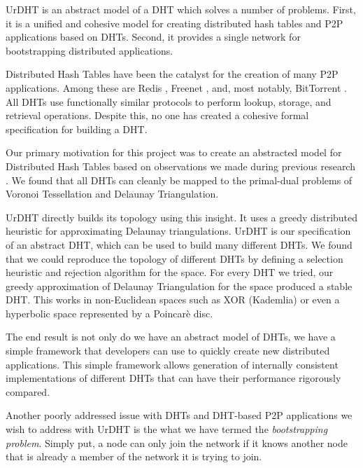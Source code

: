 \documentclass[11pt,conference]{IEEEtran}
\begin{document}
UrDHT is an abstract model of a DHT which solves a number of problems.
First, it is a unified and cohesive model for creating distributed hash tables and P2P applications based on DHTs.
Second, it provides a single network for bootstrapping distributed applications.
%

Distributed Hash Tables have been the catalyst for the creation of many P2P applications.
Among these are Redis \cite{redis}, Freenet \cite{freenet}, and, most notably, BitTorrent \cite{bittorrent}. 
All DHTs use functionally similar protocols to perform lookup, storage, and retrieval operations.
Despite this, no one has created a cohesive formal specification for building a DHT.

Our primary motivation for this project was to create an abstracted model for Distributed Hash Tables based on observations we made during previous research \cite{dgvh}.
We found that all DHTs can cleanly be mapped to the primal-dual problems of Voronoi Tessellation and Delaunay Triangulation.

UrDHT directly builds its topology using this insight.
It uses a greedy distributed heuristic for approximating Delaunay triangulations.
UrDHT is our specification of an abstract DHT, which can be used to build many different DHTs.
We found that we could reproduce the topology of different DHTs by defining a selection heuristic and rejection algorithm for the space.
For every DHT we tried, our greedy approximation of Delaunay Triangulation %
for the space produced a stable DHT.  
This works in non-Euclidean spaces such as XOR (Kademlia)  or even a hyperbolic space represented by a Poincar\`{e} disc.

The end result is not only do we have an abstract model of DHTs, we have a simple framework that developers can use to quickly create new distributed applications.
This simple framework allows generation of internally consistent implementations of different DHTs that can have their performance rigorously compared.  %



Another poorly addressed issue with DHTs and DHT-based P2P applications we wish to address with UrDHT is the what we have termed the \textit{bootstrapping problem}.
Simply put, a node can only join the network if it knows another node that is already a member of the network it is trying to join.
\end{document}
